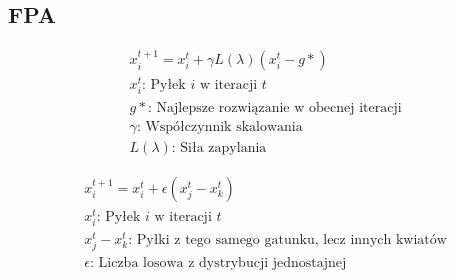 \documentclass[aspectratio=169,15pt,]{beamer}
\begin{document}
\subsection{FPA}
\begin{frame}
	\subsectionpage
\end{frame}
\begin{frame}
	\centering
	\begin{align*}
	&x_i^{t+1}=x_i^t +\gamma L (\lambda )(x_i^t - g* ) \\
	&x_i^t  \text{: Pyłek } i \text{ w iteracji } t\\
	&g* \text{: Najlepsze rozwiązanie w obecnej iteracji}\\
	& \gamma \text{: Współczynnik skalowania}\\
	&L(\lambda) \text{: Siła zapylania}
	\end{align*}


\end{frame}

\begin{frame}
	\centering
	\begin{align*}
	&x_i^{t+1}=x_i^t +\epsilon ( x_j^t - x_k^t)\\
	&x_i^t  \text{: Pyłek } i \text{ w iteracji } t\\
	& x_j^t - x_k^t \text{: Pyłki z tego samego gatunku, lecz innych kwiatów}\\
	& \epsilon \text{: Liczba losowa z dystrybucji jednostajnej}
	\end{align*}


\end{frame}
\end{document}
